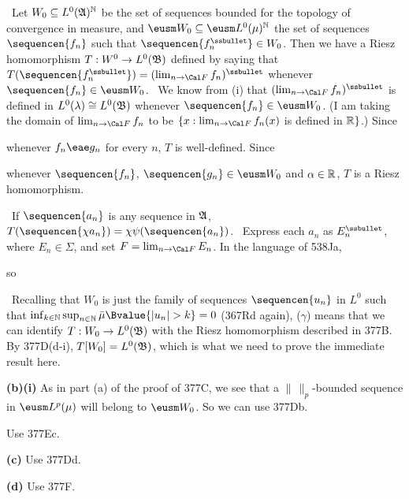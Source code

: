 {\medskip

\qquad\grheadb\
Let $W_0\subseteq L^0(\frak A)^{\Bbb N}$ be the set of sequences bounded
for the topology of convergence in measure, and
$\eusm W_0\subseteq\eusm L^0(\mu)^{\Bbb N}$ the set of sequences
$\sequencen{f_n}$ such that $\sequencen{f_n^{\ssbullet}}\in W_0$.
Then we have a Riesz
homomorphism $T:W^0\to L^0(\frak B)$ defined by saying that
$T(\sequencen{f_n^{\ssbullet}})=(\lim_{n\to\Cal F}f_n)^{\ssbullet}$
whenever $\sequencen{f_n}\in\eusm W_0$.   \Prf\ We know from (i) that
$(\lim_{n\to\Cal F}f_n)^{\ssbullet}$ is defined in
$L^0(\lambda)\cong L^0(\frak B)$ whenever $\sequencen{f_n}\in\eusm W_0$.
(I am taking the domain of $\lim_{n\to\Cal F}f_n$ to be
$\{x:\lim_{n\to\Cal F}f_n(x)$ is defined in $\Bbb R\}$.)   Since


\noindent whenever $f_n\eae g_n$ for every $n$, $T$ is
well-defined.   Since



\noindent whenever $\sequencen{f_n}$, $\sequencen{g_n}\in\eusm W_0$ and
$\alpha\in\Bbb R$, $T$ is a Riesz homomorphism.\ \Qed

\medskip

\qquad\grheadc\ If $\sequencen{a_n}$ is any sequence in $\frak A$,
$T(\sequencen{\chi a_n})=\chi\psi(\sequencen{a_n})$.   \Prf\
Express each $a_n$ as $E_n^{\ssbullet}$, where $E_n\in\Sigma$, and set
$F=\lim_{n\to\Cal F}E_n$.   In the language of 538Ja,

\Centerline{$\psi(\sequencen{a_n})
=\pi^{-1}\phi(\sequencen{a_n})
=\pi^{-1}(\sequencen{a_n}^{\ssbullet})
=F^{\ssbullet}$,}

\noindent so


\medskip

\qquad\grheadd\ Recalling that $W_0$ is just the family of sequences
$\sequencen{u_n}$ in $L^0$ such that
$\inf_{k\in\Bbb N}\sup_{n\in\Bbb N}\bar\mu\Bvalue{|u_n|>k}=0$
(367Rd again),
($\gamma$) means that we can identify $T:W_0\to L^0(\frak B)$
with the Riesz homomorphism described in 377B.   By 377D(d-i),
$T[W_0]=L^0(\frak B)$, which is what we need to prove the immediate result
here.

\medskip

{\bf (b)(i)} As in part (a) of the proof of
377C, we see that a $\|\,\|_p$-bounded
sequence in $\eusm L^p(\mu)$ will belong to $\eusm W_0$.   So we can use
377Db.

\medskip

 Use 377Ec.

\medskip

{\bf (c)} Use 377Dd.

\medskip

{\bf (d)} Use 377F.
}%

